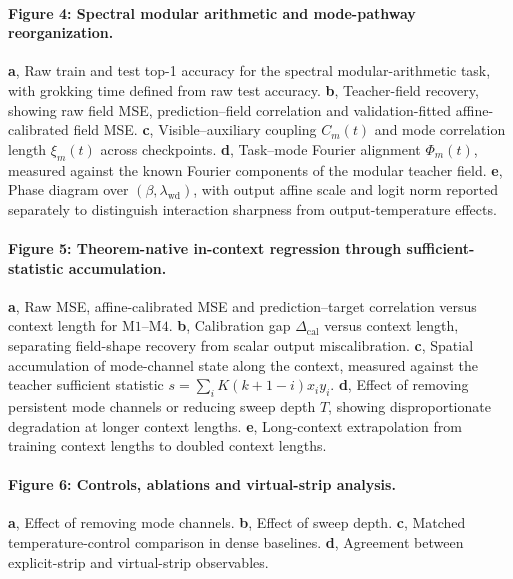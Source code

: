 \documentclass[11pt]{article}
\theoremstyle{definition}
\newcommand{\Mone}{\ensuremath{\mathrm{M1}}}
\newcommand{\Mfour}{\ensuremath{\mathrm{M4}}}
\begin{document}
\paragraph{Figure 4: Spectral modular arithmetic and mode-pathway reorganization.}
\textbf{a}, Raw train and test top-1 accuracy for the spectral modular-arithmetic task, with grokking time defined from raw test accuracy.
\textbf{b}, Teacher-field recovery, showing raw field MSE, prediction--field correlation and validation-fitted affine-calibrated field MSE.
\textbf{c}, Visible--auxiliary coupling \(C_m(t)\) and mode correlation length \(\xi_m(t)\) across checkpoints.
\textbf{d}, Task--mode Fourier alignment \(\Phi_m(t)\), measured against the known Fourier components of the modular teacher field.
\textbf{e}, Phase diagram over \((\beta,\lambda_{\mathrm{wd}})\), with output affine scale and logit norm reported separately to distinguish interaction sharpness from output-temperature effects.

\paragraph{Figure 5: Theorem-native in-context regression through sufficient-statistic accumulation.}
\textbf{a}, Raw MSE, affine-calibrated MSE and prediction--target correlation versus context length for \Mone{}--\Mfour{}.
\textbf{b}, Calibration gap \(\Delta_{\mathrm{cal}}\) versus context length, separating field-shape recovery from scalar output miscalibration.
\textbf{c}, Spatial accumulation of mode-channel state along the context, measured against the teacher sufficient statistic \(s=\sum_i K(k+1-i)x_i y_i\).
\textbf{d}, Effect of removing persistent mode channels or reducing sweep depth \(T\), showing disproportionate degradation at longer context lengths.
\textbf{e}, Long-context extrapolation from training context lengths to doubled context lengths.


\paragraph{Figure 6: Controls, ablations and virtual-strip analysis.}
\textbf{a}, Effect of removing mode channels.
\textbf{b}, Effect of sweep depth.
\textbf{c}, Matched temperature-control comparison in dense baselines.
\textbf{d}, Agreement between explicit-strip and virtual-strip observables.

\clearpage
\appendix
\renewcommand{\thesection}{Supplementary Note \arabic{section}}
\end{document}
